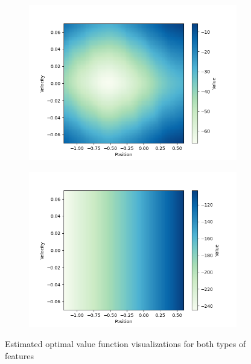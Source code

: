 \documentclass[11pt,addpoints,answers]{exam}
\begin{document}
\begin{questions}
\begin{parts}
    \begin{your_solution}[title=Plot of Tile with Replay Buffer, height=10cm]
    \end{your_solution}
    
    \begin{your_solution}[title=Comment,height=5cm]
    \end{your_solution}
    
    \clearpage
    \begin{figure}[H]
        \centering
        \begin{subfigure}{0.5\textwidth}
            \hspace{2em}\includegraphics[width=0.8\linewidth]{figs/value_A.png}
            \caption{}
            \label{fig:value_a}
        \end{subfigure}%
        \begin{subfigure}{0.5\textwidth}
            \hspace{2em}\includegraphics[width=0.8\linewidth]{figs/value_B.png}
            \caption{}
            \label{fig:value_b}
        \end{subfigure}
        \caption{Estimated optimal value function visualizations for both types of features}
        \label{fig:value}
    \end{figure}
    

\end{parts}
\end{questions}
\end{document}
